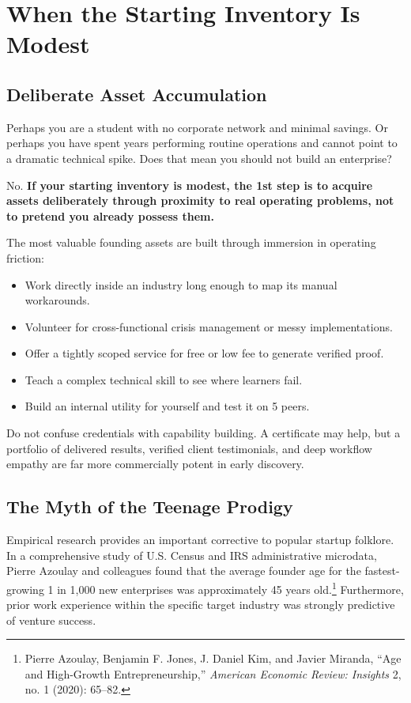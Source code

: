 \section{When the Starting Inventory Is Modest}

\subsection{Deliberate Asset Accumulation}

Perhaps you are a student with no corporate network and minimal savings. Or perhaps you have spent years performing routine operations and cannot point to a dramatic technical spike. Does that mean you should not build an enterprise?

No. \textbf{If your starting inventory is modest, the 1st step is to acquire assets deliberately through proximity to real operating problems, not to pretend you already possess them.}

The most valuable founding assets are built through immersion in operating friction:
\begin{itemize}[leftmargin=11pt,itemsep=1.5pt,topsep=1.5pt,parsep=0pt]
  \item Work directly inside an industry long enough to map its manual workarounds.
  \item Volunteer for cross-functional crisis management or messy implementations.
  \item Offer a tightly scoped service for free or low fee to generate verified proof.
  \item Teach a complex technical skill to see where learners fail.
  \item Build an internal utility for yourself and test it on 5 peers.
\end{itemize}

Do not confuse credentials with capability building. A certificate may help, but a portfolio of delivered results, verified client testimonials, and deep workflow empathy are far more commercially potent in early discovery.

\subsection{The Myth of the Teenage Prodigy}

Empirical research provides an important corrective to popular startup folklore. In a comprehensive study of U.S. Census and IRS administrative microdata, Pierre Azoulay and colleagues found that the average founder age for the fastest-growing 1 in 1,000 new enterprises was approximately 45 years old.\footnote{Pierre Azoulay, Benjamin F. Jones, J. Daniel Kim, and Javier Miranda, ``Age and High-Growth Entrepreneurship,'' \textit{American Economic Review: Insights} 2, no. 1 (2020): 65--82.} Furthermore, prior work experience within the specific target industry was strongly predictive of venture success.

